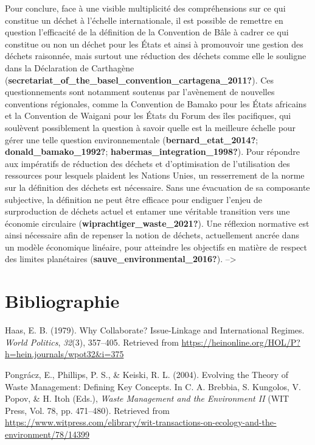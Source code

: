\documentclass[12pt]{ulaval}
\newenvironment{CSLReferences}%
  {}%
  {\par}
\begin{document}
Pour conclure, face à une visible multiplicité des compréhensions sur ce qui constitue un déchet à l'échelle internationale, il est possible de remettre en question l'efficacité de la définition de la Convention de Bâle à cadrer ce qui constitue ou non un déchet pour les États et ainsi à promouvoir une gestion des déchets raisonnée, mais surtout une réduction des déchets comme elle le souligne dans la Déclaration de Carthagène (\textbf{secretariat\_of\_the\_basel\_convention\_cartagena\_2011?}). Ces questionnements sont notamment soutenus par l'avènement de nouvelles conventions régionales, comme la Convention de Bamako pour les États africains et la Convention de Waigani pour les États du Forum des îles pacifiques, qui soulèvent possiblement la question à savoir quelle est la meilleure échelle pour gérer une telle question environnementale (\textbf{bernard\_etat\_2014?}; \textbf{donald\_bamako\_1992?}; \textbf{habermas\_integration\_1998?}). Pour répondre aux impératifs de réduction des déchets et d'optimisation de l'utilisation des ressources pour lesquels plaident les Nations Unies, un resserrement de la norme sur la définition des déchets est nécessaire. Sans une évacuation de sa composante subjective, la définition ne peut être efficace pour endiguer l'enjeu de surproduction de déchets actuel et entamer une véritable transition vers une économie circulaire (\textbf{wiprachtiger\_waste\_2021?}). Une réflexion normative est ainsi nécessaire afin de repenser la notion de déchets, actuellement ancrée dans un modèle économique linéaire, pour atteindre les objectifs en matière de respect des limites planétaires (\textbf{sauve\_environmental\_2016?}). --\textgreater{}

\backmatter

\chapter*{Bibliographie}\label{bibliographie}


\noindent

\setlength{\parindent}{-0.20in}
\setlength{\leftskip}{0.20in}
\setlength{\parskip}{8pt}

\label{refs}
\begin{CSLReferences}{1}{0}
Haas, E. B. (1979). Why {Collaborate}? {Issue}-{Linkage} and {International} {Regimes}. \emph{World Politics}, \emph{32}(3), 357--405. Retrieved from \url{https://heinonline.org/HOL/P?h=hein.journals/wpot32&i=375}

Pongrácz, E., Phillips, P. S., \& Keiski, R. L. (2004). Evolving the {Theory} of {Waste} {Management}: {Defining} {Key} {Concepts}. In C. A. Brebbia, S. Kungolos, V. Popov, \& H. Itoh (Eds.), \emph{Waste {Management} and the {Environment} {II}} (WIT Press, Vol. 78, pp. 471--480). Retrieved from \url{https://www.witpress.com/elibrary/wit-transactions-on-ecology-and-the-environment/78/14399}

\end{CSLReferences}


\end{document}
